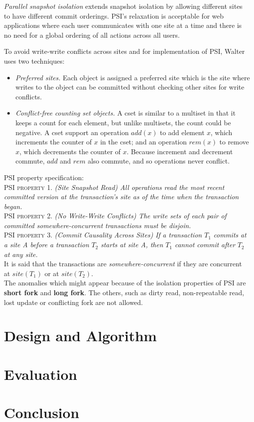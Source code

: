 \documentclass[a4paper]{article}
\begin{document}
\textit{Parallel snapshot isolation} extends snapshot isolation by allowing different sites to have different commit orderings. PSI's relaxation is acceptable for web applications where each user communicates with one site at a time and there is no need for a global ordering of all actions across all users. 

To avoid write-write conflicts across sites and for implementation of PSI, Walter uses two techniques:
\begin{itemize}
\item \textit{Preferred sites.} Each object is assigned a preferred site which is the site where writes to the object can be committed without checking other sites for write conflicts.
\item \textit{Conflict-free counting set objects.} A cset is similar to a multiset in that it keeps a count for each element, but unlike multisets, the count could be negative. A cset support an operation $add(x)$ to add element $x$, which increments the counter of $x$ in the cset; and an operation $rem(x)$ to remove $x$, which decrements the counter of $x$. Because increment and decrement commute, $add$ and $rem$ also commute, and so operations never conflict. 
\end{itemize}

PSI property specification:\\

PSI \textsc{property} 1. \textit{(Site Snapshot Read) All operations read the most recent committed version at the transaction's site as of the time when the transaction began.}\\

PSI \textsc{property} 2. \textit{(No Write-Write Conflicts) The write sets of each pair of committed somewhere-concurrent transactions must be disjoin.}\\

PSI \textsc{property} 3. \textit{(Commit Causality Across Sites) If a transaction $T_{1}$ commits at a site A before a transaction $T_{2}$ starts at site A, then $T_{1}$ cannot commit after $T_{2}$ at any site.}\\

It is said that the transactions are \textit{somewhere-concurrent} if they are concurrent at $site(T_{1})$ or at $site(T_{2})$.
\\
The anomalies which might appear because of the isolation properties of PSI are \textbf{short fork} and \textbf{long fork}. The others, such as dirty read, non-repeatable read, lost update or conflicting fork are not allowed. 


\section{Design and Algorithm}
\section{Evaluation}


\section{Conclusion}
\end{document}
